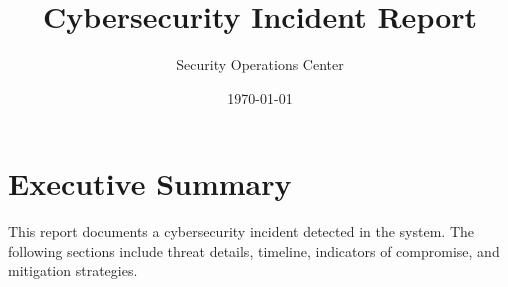 \documentclass{article}
\title{Cybersecurity Incident Report}
\author{Security Operations Center}
\date{\today}
\begin{document}
\maketitle

\section*{Executive Summary}

This report documents a cybersecurity incident detected in the system.
The following sections include threat details, timeline, indicators of compromise,
and mitigation strategies.


\end{document}
